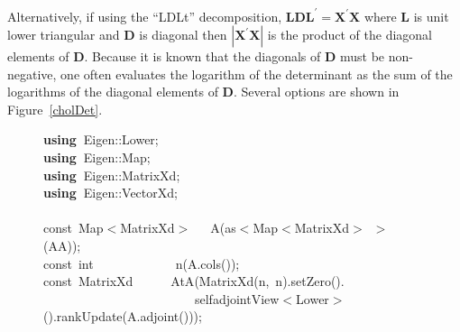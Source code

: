 \documentclass[shortnames,article]{jss}
\newcommand{\hlstd}[1]{\textcolor[rgb]{0,0,0}{#1}}
\newcommand{\hlopt}[1]{\textcolor[rgb]{0,0,0}{#1}}
\newcommand{\hlkwa}[1]{\textcolor[rgb]{0.61,0.13,0.93}{\bf{#1}}}
\newcommand{\hlkwb}[1]{\textcolor[rgb]{0.13,0.54,0.13}{#1}}
\newcommand{\hlkwd}[1]{\textcolor[rgb]{0,0,0}{#1}}
\begin{document}
Alternatively, if using the ``LDLt'' decomposition, $\bm L\bm D\bm
L^\prime=\bm X^\prime\bm X$ where $\bm L$ is unit lower triangular and
$\bm D$ is diagonal then $|\bm X^\prime\bm X|$ is the product of the
diagonal elements of $\bm D$.  Because it is known that the diagonals of
$\bm D$ must be non-negative, one often evaluates the logarithm of the
determinant as the sum of the logarithms of the diagonal elements of
$\bm D$.  Several options are shown in Figure~\ref{cholDet}.


\begin{figure}[htb]
    \noindent
    \ttfamily
    \hlstd{}\hlkwa{using\ }\hlstd{Eigen}\hlopt{::}\hlstd{Lower}\hlopt{;}\hspace*{\fill}\\
    \hlstd{}\hlkwa{using\ }\hlstd{Eigen}\hlopt{::}\hlstd{Map}\hlopt{;}\hspace*{\fill}\\
    \hlstd{}\hlkwa{using\ }\hlstd{Eigen}\hlopt{::}\hlstd{MatrixXd}\hlopt{;}\hspace*{\fill}\\
    \hlstd{}\hlkwa{using\ }\hlstd{Eigen}\hlopt{::}\hlstd{VectorXd}\hlopt{;}\hspace*{\fill}\\
    \hlstd{}\hspace*{\fill}\\
    \hlkwb{const\ }\hlstd{Map}\hlopt{$<$}\hlstd{MatrixXd}\hlopt{$>$}\hlstd{\ \ \ }\hlopt{}\hlstd{}\hlkwd{A}\hlstd{}\hlopt{(}\hlstd{as}\hlopt{$<$}\hlstd{Map}\hlopt{$<$}\hlstd{MatrixXd}\hlopt{$>$\ $>$(}\hlstd{AA}\hlopt{));}\hspace*{\fill}\\
    \hlstd{}\hlkwb{const\ int}\hlstd{\ \ \ \ \ \ \ \ \ \ \ \ \ }\hlkwb{}\hlstd{}\hlkwd{n}\hlstd{}\hlopt{(}\hlstd{A}\hlopt{.}\hlstd{}\hlkwd{cols}\hlstd{}\hlopt{());}\hspace*{\fill}\\
    \hlstd{}\hlkwb{const\ }\hlstd{MatrixXd}\hlstd{\ \ \ \ \ \ }\hlstd{}\hlkwd{AtA}\hlstd{}\hlopt{(}\hlstd{}\hlkwd{MatrixXd}\hlstd{}\hlopt{(}\hlstd{n}\hlopt{,\ }\hlstd{n}\hlopt{).}\hlstd{}\hlkwd{setZero}\hlstd{}\hlopt{().}\hspace*{\fill}\\
    \hlstd{}\hlstd{\ \ \ \ \ \ \ \ \ \ \ \ \ \ \ \ \ \ \ \ \ \ \ \ }\hlstd{selfadjointView}\hlopt{$<$}\hlstd{Lower}\hlopt{$>$().}\hlstd{}\hlkwd{rankUpdate}\hlstd{}\hlopt{(}\hlstd{A}\hlopt{.}\hlstd{}\hlkwd{adjoint}\hlstd{}\hlopt{()));}\hspace*{\fill}\\

\end{figure}
\end{document}
